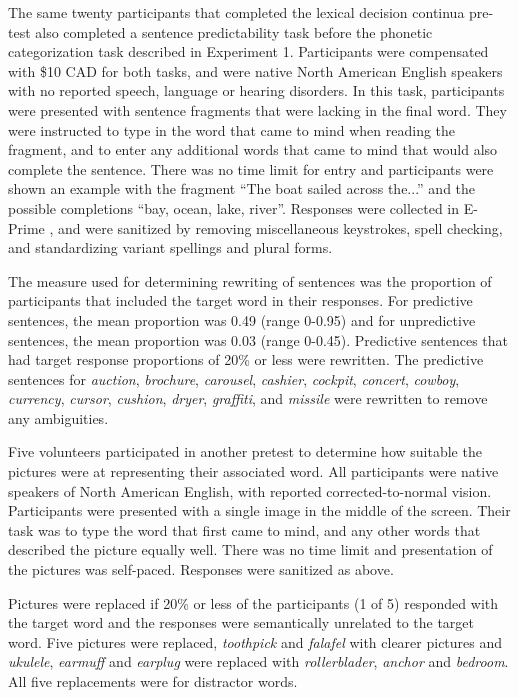 The same twenty participants that completed the lexical decision continua pre-test also completed a sentence predictability task before the phonetic categorization task described in Experiment 1. 
Participants were compensated with \$10 CAD for both tasks, and were native North American English speakers with no reported speech, language or hearing disorders. In this task, participants were presented with sentence fragments that were lacking in the final word.  
They were instructed to type in the word that came to mind when reading the fragment, and to enter any additional words that came to mind that would also complete the sentence.  
There was no time limit for entry and participants were shown an example with the fragment ``The boat sailed across the...'' and the possible completions ``bay, ocean, lake, river''.  
Responses were collected in E-Prime \citep{PsychologySoftwareTools2012}, and were sanitized by removing miscellaneous keystrokes, spell checking, and standardizing variant spellings and plural forms.

The measure used for determining rewriting of sentences was the proportion of participants that included the target word in their responses.  
For predictive sentences, the mean proportion was 0.49 (range 0-0.95) and for unpredictive sentences, the mean proportion was 0.03 (range 0-0.45).  
Predictive sentences that had target response proportions of 20\% or less were rewritten.  
The predictive sentences for \emph{auction}, \emph{brochure}, \emph{carousel}, \emph{cashier}, \emph{cockpit}, \emph{concert}, \emph{cowboy}, \emph{currency}, \emph{cursor}, \emph{cushion}, \emph{dryer}, \emph{graffiti}, and \emph{missile} were rewritten to remove any ambiguities.  

Five volunteers participated in another pretest to determine how suitable the pictures were at representing their associated word.  
All participants were native speakers of North American English, with reported corrected-to-normal vision. Participants were presented with a single image in the middle of the screen.  
Their task was to type the word that first came to mind, and any other words that described the picture equally well.  
There was no time limit and presentation of the pictures was self-paced. Responses were sanitized as above.  

Pictures were replaced if 20\% or less of the participants (1 of 5) responded with the target word and the responses were semantically unrelated to the target word. 
Five pictures were replaced, \emph{toothpick} and \emph{falafel} with clearer pictures and \emph{ukulele}, \emph{earmuff} and \emph{earplug} were replaced with \emph{rollerblader}, \emph{anchor} and \emph{bedroom}.  
All five replacements were for distractor words.

